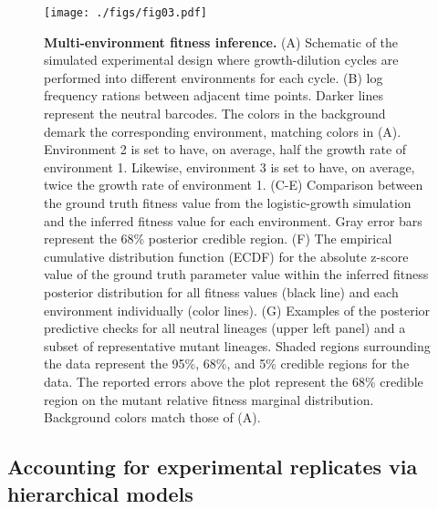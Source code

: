 \documentclass[
]{scrartcl}
\begin{document}
\begin{refsegment}
\begin{figure}

{\centering \texttt{[image: ./figs/fig03.pdf]}

}

\caption{\label{fig-03}\textbf{Multi-environment fitness inference.} (A)
Schematic of the simulated experimental design where growth-dilution
cycles are performed into different environments for each cycle. (B) log
frequency rations between adjacent time points. Darker lines represent
the neutral barcodes. The colors in the background demark the
corresponding environment, matching colors in (A). Environment 2 is set
to have, on average, half the growth rate of environment 1. Likewise,
environment 3 is set to have, on average, twice the growth rate of
environment 1. (C-E) Comparison between the ground truth fitness value
from the logistic-growth simulation and the inferred fitness value for
each environment. Gray error bars represent the 68\% posterior credible
region. (F) The empirical cumulative distribution function (ECDF) for
the absolute z-score value of the ground truth parameter value within
the inferred fitness posterior distribution for all fitness values
(black line) and each environment individually (color lines). (G)
Examples of the posterior predictive checks for all neutral lineages
(upper left panel) and a subset of representative mutant lineages.
Shaded regions surrounding the data represent the 95\%, 68\%, and 5\%
credible regions for the data. The reported errors above the plot
represent the 68\% credible region on the mutant relative fitness
marginal distribution. Background colors match those of (A).}

\end{figure}

\hypertarget{sec-replicates}{%
\subsection{Accounting for experimental replicates via hierarchical
models}\label{sec-replicates}}


\end{refsegment}
\end{document}
